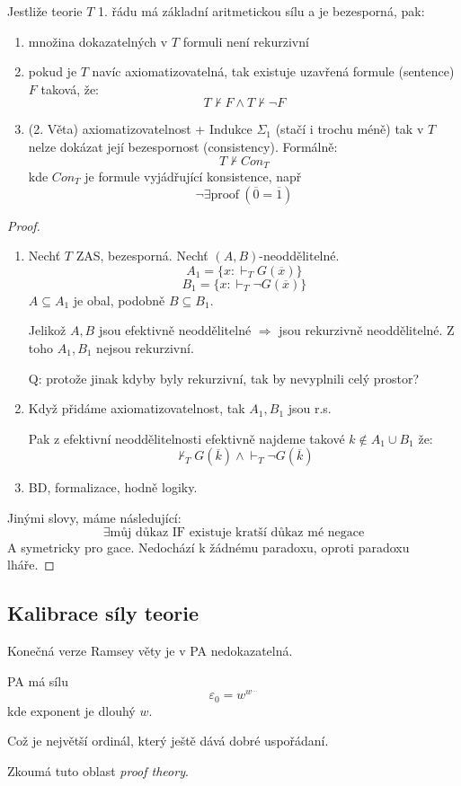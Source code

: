 \begin{theorem}\label{godel}
	Jestliže teorie $T$ 1. řádu má základní aritmetickou sílu a je bezesporná, pak:
	\begin{enumerate}
		\item množina dokazatelných v $T$ formuli není rekurzivní
		\item pokud je $T$ navíc axiomatizovatelná, tak existuje uzavřená formule (sentence) $F$ taková, že:
			\[ T \nvdash F \land T \nvdash \neg F \]
		\item (2. Věta) axiomatizovatelnost + Indukce $\Sigma_1$ (stačí i trochu méně) tak v $T$ nelze dokázat její bezespornost (consistency).
		Formálně:
		\[ T \nvdash Con_T \]
		kde $Con_T$ je formule vyjádřující konsistence, např
		\[ \neg \exists \text{proof}\ (\overline{0} = \overline{1}) \]
	\end{enumerate}
\end{theorem}
\begin{proof}
	\begin{enumerate}
		\item Nechť $T$ ZAS, bezesporná. Nechť $(A, B)$-neoddělitelné.
			\[ A_1 = \{ x: \vdash_T G(\overline{x}) \} \]
			\[ B_1 = \{ x: \vdash_T \neg G(\overline{x}) \} \]
			$A \subseteq A_1$ je obal, podobně $B \subseteq B_1$.

			Jelikož $A, B$ jsou efektivně neoddělitelné $\Rightarrow$ jsou rekurzivně neoddělitelné.
			Z toho $A_1, B_1$ nejsou rekurzivní.

			Q: protože jinak kdyby byly rekurzivní, tak by nevyplnili celý prostor?
		\item Když přidáme axiomatizovatelnost, tak $A_1, B_1$  jsou r.s.

			Pak z efektivní neoddělitelnosti efektivně najdeme takové $k \notin A_1 \cup B_1$ že:
			\[ \nvdash_T G(\overline{k}) \land \vdash_T \neg G(\overline{k}) \]
		\item BD, formalizace, hodně logiky.
	\end{enumerate}

	Jinými slovy, máme následující:
	\[ \exists \text{můj důkaz IF existuje kratší důkaz mé negace} \]
	A symetricky pro gace. Nedochází k žádnému paradoxu, oproti paradoxu lháře.
\end{proof}

\subsection{Kalibrace síly teorie}

\begin{note}
	Konečná verze Ramsey věty je v PA nedokazatelná.
\end{note}

\begin{note}
	PA má sílu
	\[ \varepsilon_0 = w^{w^{\ldots}} \]
	kde exponent je dlouhý $w$.

	Což je největší ordinál, který ještě dává dobré uspořádaní.

	Zkoumá tuto oblast \emph{proof theory}.
\end{note}
